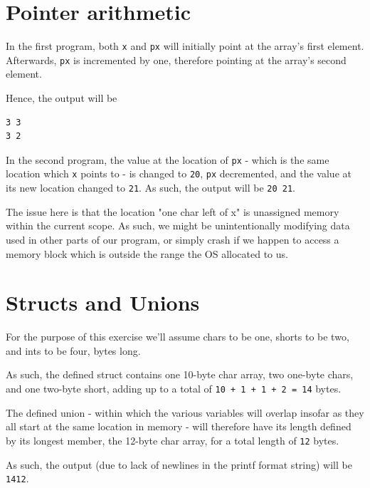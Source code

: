 \documentclass[a4paper]{scrartcl}
\begin{document}
\section{Pointer arithmetic}

In the first program, both \texttt{x} and \texttt{px} will initially point at
the array's first element. Afterwards, \texttt{px} is incremented by one,
therefore pointing at the array's second element.

Hence, the output will be

\begin{lstlisting}
3 3
3 2
\end{lstlisting}

In the second program, the value at the location of \texttt{px} - which is the
same location which \texttt{x} points to - is changed to \texttt{20},
\texttt{px} decremented, and the value at its new location changed to
\texttt{21}. As such, the output will be \texttt{20 21}.

The issue here is that the location "one char left of x" is unassigned memory
within the current scope. As such, we might be unintentionally modifying data
used in other parts of our program, or simply crash if we happen to access a
memory block which is outside the range the OS allocated to us.


\section{Structs and Unions}

For the purpose of this exercise we'll assume chars to be one, shorts to be
two, and ints to be four, bytes long.

As such, the defined struct contains one 10-byte char array, two one-byte
chars, and one two-byte short, adding up to a total of \texttt{10 + 1 + 1 + 2 =
14} bytes.

The defined union - within which the various variables will overlap insofar as they
all start at the same location in memory - will therefore have its length defined by its
longest member, the 12-byte char array, for a total length of \texttt{12}
bytes.

As such, the output (due to lack of newlines in the printf format string) will be \texttt{1412}.
\end{document}
